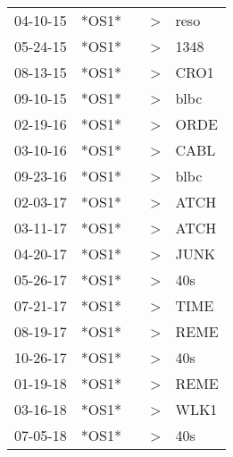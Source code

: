 \begin{supertabular}{p{0.07\textwidth}p{0.06\textwidth}p{0.02\textwidth}p{0.02\textwidth}p{0.06\textwidth}}
 04-10-15\textsuperscript{} &                   *OS1* &    &     \textgreater &           reso\textsuperscript{} \\
 05-24-15\textsuperscript{} &                   *OS1* &    &     \textgreater &           1348\textsuperscript{} \\
 08-13-15\textsuperscript{} &                   *OS1* &    &     \textgreater &           CRO1\textsuperscript{} \\
 09-10-15\textsuperscript{} &                   *OS1* &    &     \textgreater &           blbc\textsuperscript{} \\
 02-19-16\textsuperscript{} &                   *OS1* &    &     \textgreater &           ORDE\textsuperscript{} \\
 03-10-16\textsuperscript{} &                   *OS1* &    &     \textgreater &           CABL\textsuperscript{} \\
 09-23-16\textsuperscript{} &                   *OS1* &    &     \textgreater &           blbc\textsuperscript{} \\
 02-03-17\textsuperscript{} &                   *OS1* &    &     \textgreater &           ATCH\textsuperscript{} \\
 03-11-17\textsuperscript{} &                   *OS1* &    &     \textgreater &           ATCH\textsuperscript{} \\
 04-20-17\textsuperscript{} &                   *OS1* &    &     \textgreater &           JUNK\textsuperscript{} \\
 05-26-17\textsuperscript{} &                   *OS1* &    &     \textgreater &            40s\textsuperscript{} \\
 07-21-17\textsuperscript{} &                   *OS1* &    &     \textgreater &           TIME\textsuperscript{} \\
 08-19-17\textsuperscript{} &                   *OS1* &    &     \textgreater &           REME\textsuperscript{} \\
 10-26-17\textsuperscript{} &                   *OS1* &    &     \textgreater &            40s\textsuperscript{} \\
 01-19-18\textsuperscript{} &                   *OS1* &    &     \textgreater &           REME\textsuperscript{} \\
 03-16-18\textsuperscript{} &                   *OS1* &    &     \textgreater &           WLK1\textsuperscript{} \\
 07-05-18\textsuperscript{} &                   *OS1* &    &     \textgreater &            40s\textsuperscript{} \\

\end{supertabular}
